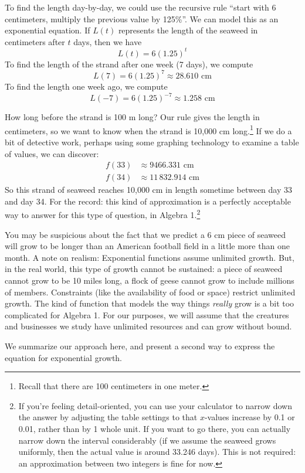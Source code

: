 To find the length day-by-day, we could use the recursive rule ``start with 6 centimeters, multiply the previous value by 125\%''. We can model this as an exponential equation. If $L(t)$ represents the length of the seaweed in centimeters after $t$ days, then we have \[L(t) = 6(1.25)^t\]
To find the length of the strand after one week (7 days), we compute \[L(7) = 6(1.25)^7 \approx 28.610 \text{ cm}\]
To find the length one week ago, we compute \[L(-7) = 6(1.25)^{-7} \approx 1.258 \text{ cm}\]

How long before the strand is 100 m long? Our rule gives the length in centimeters, so we want to know when the strand is 10,000 cm long.\footnote{Recall that there are 100 centimeters in one meter.} If we do a bit of detective work, perhaps using some graphing technology to examine a table of values, we can discover:
\[\begin{aligned}
f(33) &\approx 9466.331 \text{ cm}
\\
f(34) &\approx 11\,832.914 \text{ cm}
\end{aligned}\]
So this strand of seaweed reaches 10,000 cm in length sometime between day 33 and day 34. For the record: this kind of approximation is a perfectly acceptable way to answer for this type of question, in Algebra 1.\footnote{If you're feeling detail-oriented, you can use your calculator to narrow down the answer by adjusting the table settings to that $x$-values increase by 0.1 or 0.01, rather than by 1 whole unit. If you want to go there, you can actually narrow down the interval considerably (if we assume the seaweed grows uniformly, then the actual value is around 33.246 days). This is not required: an approximation between two integers is fine for now.}

You may be suspicious about the fact that we predict a 6 cm piece of seaweed will grow to be longer than an American football field in a little more than one month. A note on realism: Exponential functions assume unlimited growth. But, in the real world, this type of growth cannot be sustained: a piece of seaweed cannot grow to be 10 miles long, a flock of geese cannot grow to include millions of members. Constraints (like the availability of food or space) restrict unlimited growth. The kind of function that models the way things \textit{really} grow is a bit too complicated for Algebra 1. For our purposes, we will assume that the creatures and businesses we study have unlimited resources and can grow without bound.

We summarize our approach here, and present a second way to express the equation for exponential growth.

